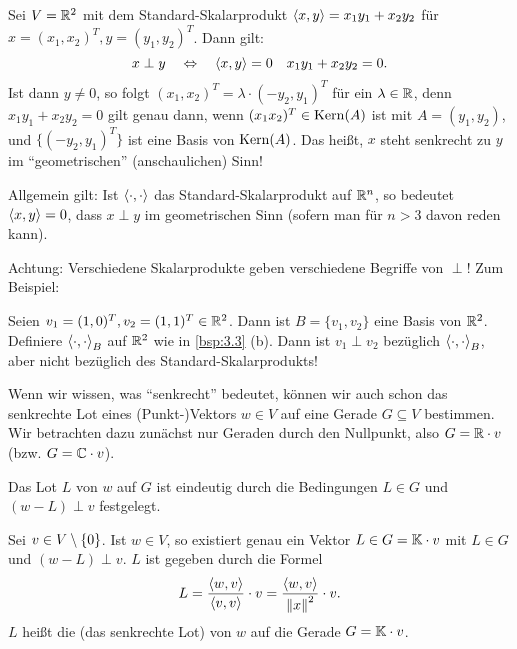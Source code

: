 \begin{beispiel}
	\label{bsp:3.11}
	Sei $V = \mathbb{R}^2$ mit dem Standard-Skalarprodukt $\left\langle x,y\right\rangle = x_1 y_1 + x_2 y_2$ für $x = (x_1,x_2)^T, y = (y_1,y_2)^T$.
	Dann gilt:
	\[
		x \perp y \quad \Leftrightarrow \quad \left\langle x,y\right\rangle = 0 \quad x_1y_1 + x_2y_2 = 0.
	\]
	Ist dann $y \neq 0$, so folgt $(x_1, x_2)^T = \lambda \cdot (-y_2,y_1)^T$ für ein $\lambda \in \mathbb{R}$, denn $x_1 y_1 + x_2 y_2 = 0$ gilt genau dann, wenn $(x_1 x_2)^T \in \operatorname{Kern}(A)$ ist mit $A = (y_1,y_2)$, und $\{ (-y_2,y_1)^T\}$ ist eine Basis von $\operatorname{Kern}(A)$.
	Das heißt, $x$ steht senkrecht zu $y$ im \enquote{geometrischen} (anschaulichen) Sinn! 
	
	Allgemein gilt: Ist $\left\langle\cdot,\cdot\right\rangle$ das Standard-Skalarprodukt auf $\mathbb{R}^n$, so bedeutet $\left\langle x,y\right\rangle = 0$, dass $x \perp y$ im geometrischen Sinn (sofern man für $n > 3$ davon reden kann).
	
	Achtung: Verschiedene Skalarprodukte geben verschiedene Begriffe von $\perp$!
	Zum Beispiel:
	
	Seien $v_1 = (1, 0)^T, v_2 = (1, 1)^T \in \mathbb{R}^2$.
	Dann ist $B = \{v_1,v_2\}$ eine Basis von $\mathbb{R}^2$.
	Definiere $\left\langle\cdot,\cdot\right\rangle_B$ auf $\mathbb{R}^2$ wie in \autoref{bsp:3.3} (b).
	Dann ist $v_1 \perp v_2$ bezüglich $\left\langle\cdot,\cdot\right\rangle_B$, aber nicht bezüglich des Standard-Skalarprodukts! 
\end{beispiel}

\begin{bemerkung}
	\label{bem:3.12}
	Wenn wir wissen, was \enquote{senkrecht} bedeutet, können wir auch schon das senkrechte Lot eines (Punkt-)Vektors $w \in V$ auf eine Gerade $G \subseteq V$ bestimmen.
	Wir betrachten dazu zunächst nur Geraden durch den Nullpunkt, also $G = \mathbb{R} \cdot v$ (bzw. $G = \mathbb{C} \cdot v$). 
	
	Das Lot $L$ von $w$ auf $G$ ist eindeutig durch die Bedingungen $L \in G$ und $(w-L) \perp v$ festgelegt.
\end{bemerkung}

\begin{lemma}
	\label{lemma:3.13}
	Sei $v \in V \setminus \{0\}$.
	Ist $w \in V$, so existiert genau ein Vektor $L \in G = \mathbb{K} \cdot v$ mit $L \in G$ und $(w-L) \perp v$.
	$L$ ist gegeben durch die Formel
	\[
		L = \frac{\left\langle w,v\right\rangle}{\left\langle v,v\right\rangle} \cdot v = \frac{\left\langle w,v\right\rangle}{\left\lVert x\right\rVert^2} \cdot v.
	\]
	$L$ heißt die  (das senkrechte Lot) von $w$ auf die Gerade $G = \mathbb{K} \cdot v$.
\end{lemma}

